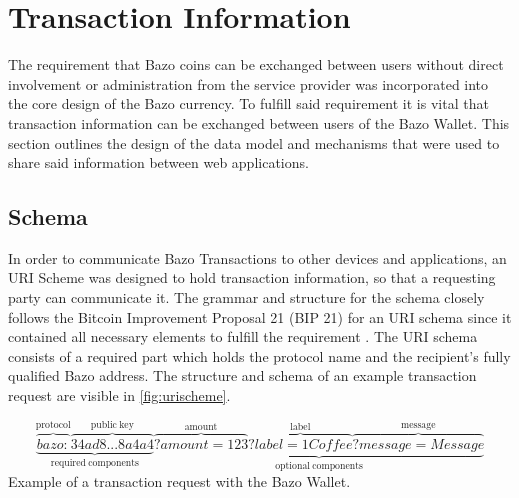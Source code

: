 \section{Transaction Information} \label{transactioninfo}
The requirement that Bazo coins can be exchanged between users without direct involvement or administration from the service provider was incorporated into the core design of the Bazo currency. To fulfill said requirement it is vital that transaction information can be exchanged between users of the Bazo Wallet. This section outlines the design of the data model and mechanisms that were used to share said information between web applications.

\subsection{Schema}\label{schema}
In order to communicate Bazo Transactions to other devices and applications, an URI Scheme was designed to hold transaction information, so that a requesting party can communicate it. The grammar and structure for the schema closely follows the Bitcoin Improvement Proposal 21 (BIP 21) for an URI schema since it contained all necessary elements to fulfill the requirement \cite{bip21}. The URI schema consists of a required part which holds the protocol name and the recipient's fully qualified Bazo address. The structure and schema of an example transaction request are visible in \ref{fig:urischeme}.

\[
\underbrace{\overbrace{bazo:}^{\mathrm{protocol}}\overbrace{34ad8...8a4a4}^{\mathrm{public\ key}}}_{\mathrm{required\ components}}
\underbrace{\overbrace{?amount=123}^{\mathrm{amoun t}}\overbrace{?label=1 Coffee}^{\mathrm{label}}\overbrace{?message=Message}^{\mathrm{message}}}_{\mathrm{optional\ components}}
\]\label{fig:urischeme}Example of a transaction request with the Bazo Wallet.

